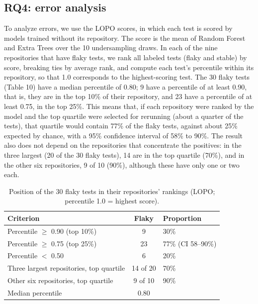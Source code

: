 \medskip
\noindent{}
\medskip

\subsection{RQ4: error analysis}
To analyze errors, we use the LOPO scores, in which each test is scored by models trained without its repository. The score is the mean of Random Forest and Extra Trees over the 10 undersampling draws. In each of the nine repositories that have flaky tests, we rank all labeled tests (flaky and stable) by score, breaking ties by average rank, and compute each test's percentile within its repository, so that 1.0 corresponds to the highest-scoring test. The 30 flaky tests (Table 10) have a median percentile of 0.80; 9 have a percentile of at least 0.90, that is, they are in the top 10\% of their repository, and 23 have a percentile of at least 0.75, in the top 25\%. This means that, if each repository were ranked by the model and the top quartile were selected for rerunning (about a quarter of the tests), that quartile would contain 77\% of the flaky tests, against about 25\% expected by chance, with a 95\% confidence interval of 58\% to 90\%. The result also does not depend on the repositories that concentrate the positives: in the three largest (20 of the 30 flaky tests), 14 are in the top quartile (70\%), and in the other six repositories, 9 of 10 (90\%), although these have only one or two each.

\begin{table}[!h]
\caption{Position of the 30 flaky tests in their repositories' rankings (LOPO; percentile 1.0 = highest score).}
\label{tab:ranking}
\centering
\footnotesize
\begin{tabular}{@{}p{}cl@{}}
\hline\hline
\textbf{Criterion} & \textbf{Flaky} & \textbf{Proportion} \tabularnewline
\hline
\raggedright Percentile $\geq$ 0.90 (top 10\%) & 9 & 30\% \tabularnewline
\raggedright Percentile $\geq$ 0.75 (top 25\%) & 23 & 77\% (CI 58--90\%) \tabularnewline
\raggedright Percentile $<$ 0.50 & 6 & 20\% \tabularnewline
\raggedright Three largest repositories, top quartile & 14 of 20 & 70\% \tabularnewline
\raggedright Other six repositories, top quartile & 9 of 10 & 90\% \tabularnewline
\raggedright Median percentile & 0.80 & \tabularnewline
\hline\hline
\end{tabular}
\end{table}


